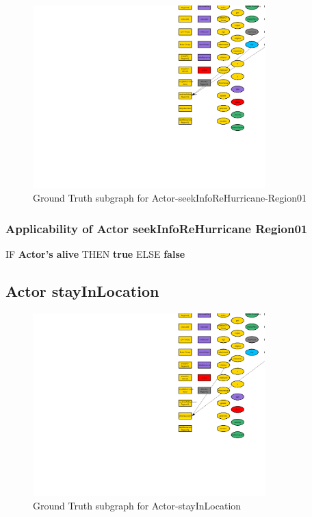 \documentclass{article}%
\begin{document}
\begin{figure}[ht]%
\centering%
\includegraphics[width=0.8\textwidth]{images/Actor-seekInfoReHurricane-Region01.png}%
\caption{Ground Truth subgraph for Actor{-}seekInfoReHurricane{-}Region01}%
\end{figure}

%
\subsubsection{Applicability of Actor seekInfoReHurricane Region01}%
\label{ssubsec:Applicability of Actor seekInfoReHurricane Region01}%
\begin{flushleft}%
IF %
\textbf{Actor's alive}%
\linebreak%
\hspace*{2em}%
THEN %
\textbf{true}%
\linebreak%
\hspace*{2em}%
ELSE %
\textbf{false}%
\end{flushleft}

%
\subsection{Actor stayInLocation}%
\label{subsec:Actor stayInLocation}%


\begin{figure}[ht]%
\centering%
\includegraphics[width=0.8\textwidth]{images/Actor-stayInLocation.png}%
\caption{Ground Truth subgraph for Actor{-}stayInLocation}%
\end{figure}
\end{document}
